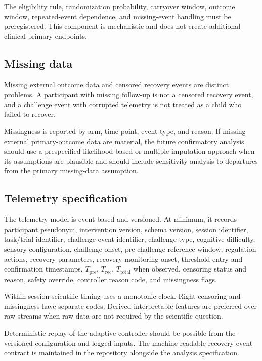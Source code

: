 The eligibility rule, randomization probability, carryover window, outcome window, repeated-event dependence, and missing-event handling must be preregistered. This component is mechanistic and does not create additional clinical primary endpoints.

\subsection{Missing data}

Missing external outcome data and censored recovery events are distinct problems. A participant with missing follow-up is not a censored recovery event, and a challenge event with corrupted telemetry is not treated as a child who failed to recover.

Missingness is reported by arm, time point, event type, and reason. If missing external primary-outcome data are material, the future confirmatory analysis should use a prespecified likelihood-based or multiple-imputation approach when its assumptions are plausible and should include sensitivity analysis to departures from the primary missing-data assumption.

\subsection{Telemetry specification}

The telemetry model is event based and versioned. At minimum, it records participant pseudonym, intervention version, schema version, session identifier, task/trial identifier, challenge-event identifier, challenge type, cognitive difficulty, sensory configuration, challenge onset, pre-challenge reference window, regulation actions, recovery parameters, recovery-monitoring onset, threshold-entry and confirmation timestamps, \(T_{\mathrm{pre}}\), \(T_{\mathrm{rec}}\), \(T_{\mathrm{total}}\) when observed, censoring status and reason, safety override, controller reason code, and missingness flags.

Within-session scientific timing uses a monotonic clock. Right-censoring and missingness have separate codes. Derived interpretable features are preferred over raw streams when raw data are not required by the scientific question.

Deterministic replay of the adaptive controller should be possible from the versioned configuration and logged inputs. The machine-readable recovery-event contract is maintained in the repository alongside the analysis specification.

